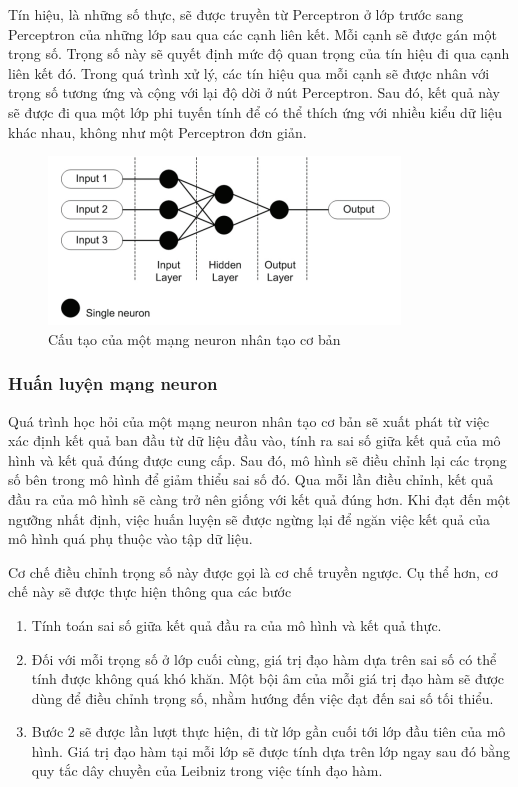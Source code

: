 Tín hiệu, là những số thực, sẽ được truyền từ Perceptron ở lớp trước sang Perceptron của những lớp sau qua các cạnh liên kết. Mỗi cạnh sẽ được gán một trọng số. Trọng số này sẽ quyết định mức độ quan trọng của tín hiệu đi qua cạnh liên kết đó. Trong quá trình xử lý, các tín hiệu qua mỗi cạnh sẽ được nhân với trọng số tương ứng và cộng với lại độ dời ở nút Perceptron. Sau đó, kết quả này sẽ được đi qua một lớp phi tuyến tính để có thể thích ứng với nhiều kiểu dữ liệu khác nhau, không như một Perceptron đơn giản.
\begin{figure}[H]
  \centering
  \includegraphics{pics/Chapter3/basicNN.png}
  \caption{Cấu tạo của một mạng neuron nhân tạo cơ bản \cite{krenker2011introduction}}
  \label{fig:enter-label}
\end{figure}
\subsubsection*{Huấn luyện mạng neuron}
Quá trình học hỏi của một mạng neuron nhân tạo cơ bản sẽ xuất phát từ việc xác định kết quả ban đầu từ dữ liệu đầu vào, tính ra sai số giữa kết quả của mô hình và kết quả đúng được cung cấp. Sau đó, mô hình sẽ điều chỉnh lại các trọng số bên trong mô hình để giảm thiểu sai số đó. Qua mỗi lần điều chỉnh, kết quả đầu ra của mô hình sẽ càng trở nên giống với kết quả đúng hơn. Khi đạt đến một ngưỡng nhất định, việc huấn luyện sẽ được ngừng lại để ngăn việc kết quả của mô hình quá phụ thuộc vào tập dữ liệu.

Cơ chế điều chỉnh trọng số này được gọi là cơ chế truyền ngược. Cụ thể hơn, cơ chế này sẽ được thực hiện thông qua các bước
\begin{enumerate}
  \item Tính toán sai số giữa kết quả đầu ra của mô hình và kết quả thực.
  \item Đối với mỗi trọng số ở lớp cuối cùng, giá trị đạo hàm dựa trên sai số có thể tính được không quá khó khăn. Một bội âm của mỗi giá trị đạo hàm sẽ được dùng để điều chỉnh trọng số, nhằm hướng đến việc đạt đến sai số tối thiểu.
  \item Bước 2 sẽ được lần lượt thực hiện, đi từ lớp gần cuối tới lớp đầu tiên của mô hình. Giá trị đạo hàm tại mỗi lớp sẽ được tính dựa trên lớp ngay sau đó bằng quy tắc dây chuyền của Leibniz trong việc tính đạo hàm.
\end{enumerate}

